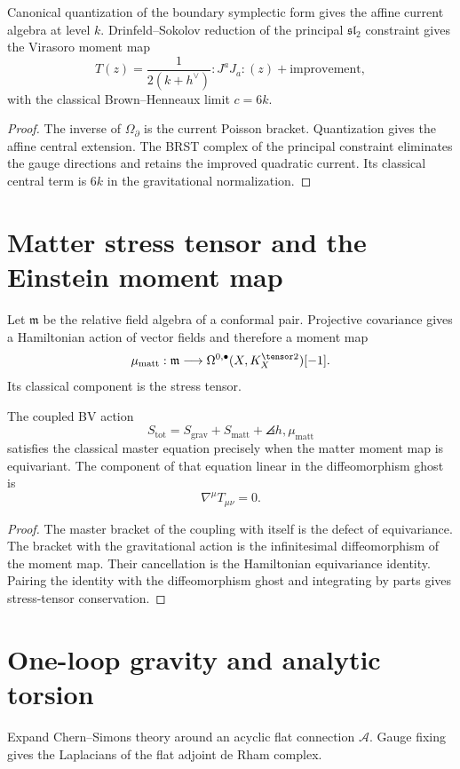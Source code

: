 \begin{theorem}
Canonical quantization of the boundary symplectic form gives the affine current algebra at level $k$.  Drinfeld--Sokolov reduction of the principal $\mathfrak{sl}_2$ constraint gives the Virasoro moment map
\[
 T(z)=\frac1{2(k+h^\vee)}:J^aJ_a:(z)+\text{improvement},
\]
with the classical Brown--Henneaux limit $c=6k$.
\end{theorem}
\begin{proof}
The inverse of $\Omega_\partial$ is the current Poisson bracket.  Quantization gives the affine central extension.  The BRST complex of the principal constraint eliminates the gauge directions and retains the improved quadratic current.  Its classical central term is $6k$ in the gravitational normalization.
\end{proof}

\chapter{Matter stress tensor and the Einstein moment map}
Let $\mathfrak m$ be the relative field algebra of a conformal pair.  Projective covariance gives a Hamiltonian action of vector fields and therefore a moment map
\[
 \mu_{\mathrm{matt}}:\mathfrak m\longrightarrow
 \Omega^{0,\bullet}(X,K_X^{\tensor2})[-1].
\]
Its classical component is the stress tensor.

\begin{theorem}
The coupled BV action
\[
 S_{\mathrm{tot}}=S_{\mathrm{grav}}+S_{\mathrm{matt}}
 +\angles{h,\mu_{\mathrm{matt}}}
\]
satisfies the classical master equation precisely when the matter moment map is equivariant.  The component of that equation linear in the diffeomorphism ghost is
\[
 \nabla^\mu T_{\mu\nu}=0.
\]
\end{theorem}
\begin{proof}
The master bracket of the coupling with itself is the defect of equivariance.  The bracket with the gravitational action is the infinitesimal diffeomorphism of the moment map.  Their cancellation is the Hamiltonian equivariance identity.  Pairing the identity with the diffeomorphism ghost and integrating by parts gives stress-tensor conservation.
\end{proof}

\chapter{One-loop gravity and analytic torsion}
Expand Chern--Simons theory around an acyclic flat connection $\mathcal A$.  Gauge fixing gives the Laplacians of the flat adjoint de Rham complex.

